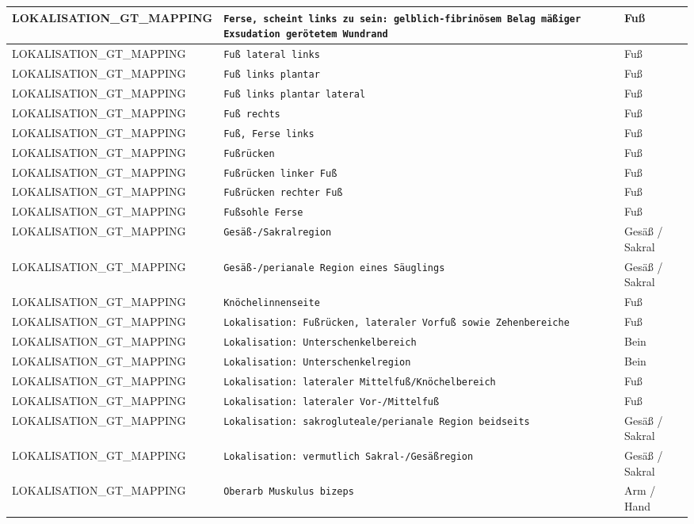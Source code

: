 \begin{longtable}{|p{3.5cm}|p{5cm}|p{6.5cm}|}
LOKALISATION\_GT\_MAPPING & \texttt{Ferse, scheint links zu sein:
gelblich-fibrinösem Belag
mäßiger Exsudation
gerötetem Wundrand} & Fuß \\ \hline
LOKALISATION\_GT\_MAPPING & \texttt{Fuß lateral links} & Fuß \\ \hline
LOKALISATION\_GT\_MAPPING & \texttt{Fuß links plantar} & Fuß \\ \hline
LOKALISATION\_GT\_MAPPING & \texttt{Fuß links plantar  lateral} & Fuß \\ \hline
LOKALISATION\_GT\_MAPPING & \texttt{Fuß rechts} & Fuß \\ \hline
LOKALISATION\_GT\_MAPPING & \texttt{Fuß, Ferse links} & Fuß \\ \hline
LOKALISATION\_GT\_MAPPING & \texttt{Fußrücken} & Fuß \\ \hline
LOKALISATION\_GT\_MAPPING & \texttt{Fußrücken linker Fuß} & Fuß \\ \hline
LOKALISATION\_GT\_MAPPING & \texttt{Fußrücken rechter Fuß} & Fuß \\ \hline
LOKALISATION\_GT\_MAPPING & \texttt{Fußsohle Ferse} & Fuß \\ \hline
LOKALISATION\_GT\_MAPPING & \texttt{Gesäß-/Sakralregion} & Gesäß / Sakral \\ \hline
LOKALISATION\_GT\_MAPPING & \texttt{Gesäß-/perianale Region eines Säuglings} & Gesäß / Sakral \\ \hline
LOKALISATION\_GT\_MAPPING & \texttt{Knöchelinnenseite} & Fuß \\ \hline
LOKALISATION\_GT\_MAPPING & \texttt{Lokalisation: Fußrücken, lateraler Vorfuß sowie Zehenbereiche} & Fuß \\ \hline
LOKALISATION\_GT\_MAPPING & \texttt{Lokalisation: Unterschenkelbereich} & Bein \\ \hline
LOKALISATION\_GT\_MAPPING & \texttt{Lokalisation: Unterschenkelregion} & Bein \\ \hline
LOKALISATION\_GT\_MAPPING & \texttt{Lokalisation: lateraler Mittelfuß/Knöchelbereich} & Fuß \\ \hline
LOKALISATION\_GT\_MAPPING & \texttt{Lokalisation: lateraler Vor-/Mittelfuß} & Fuß \\ \hline
LOKALISATION\_GT\_MAPPING & \texttt{Lokalisation: sakrogluteale/perianale Region beidseits} & Gesäß / Sakral \\ \hline
LOKALISATION\_GT\_MAPPING & \texttt{Lokalisation: vermutlich Sakral-/Gesäßregion} & Gesäß / Sakral \\ \hline
LOKALISATION\_GT\_MAPPING & \texttt{Oberarb Muskulus bizeps} & Arm / Hand \\ \hline

\end{longtable}
